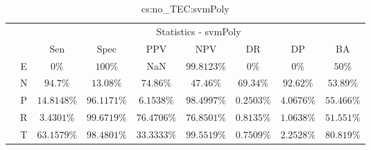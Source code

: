 \begin{table}[!ht]
	\centering
	\begin{tabular}{|c|c|c|c|c|c|c|c|c|}
		\cline{3-9}
		\multicolumn{2}{c|}{} & \multicolumn{7}{c|}{Statistics - svmPoly} \\ \cline{3-9}
		\multicolumn{2}{c|}{} & Sen & Spec & PPV & NPV & DR & DP & BA \\ \hline
		\multirow{5}{*}{\rotatebox{90}{Class}} & E & $0\%$ & $100\%$ & NaN & $99.8123\%$ & $0\%$ & $0\%$ & $50\%$ \\ \cline{2-9}
		 & N & $94.7\%$ & $13.08\%$ & $74.86\%$ & $47.46\%$ & $69.34\%$ & $92.62\%$ & $53.89\%$ \\ \cline{2-9}
		 & P & $14.8148\%$ & $96.1171\%$ & $6.1538\%$ & $98.4997\%$ & $0.2503\%$ & $4.0676\%$ & $55.466\%$ \\ \cline{2-9}
		 & R & $3.4301\%$ & $99.6719\%$ & $76.4706\%$ & $76.8501\%$ & $0.8135\%$ & $1.0638\%$ & $51.551\%$ \\ \cline{2-9}
		 & T & $63.1579\%$ & $98.4801\%$ & $33.3333\%$ & $99.5519\%$ & $0.7509\%$ & $2.2528\%$ & $80.819\%$ \\ \hline
	\end{tabular}
	\caption{cs:no_TEC:svmPoly}
	\label{tab:cs:no_TEC:svmPoly}
\end{table}
